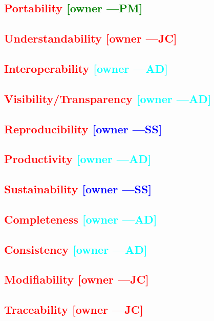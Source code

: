 \documentclass[letterpaper,cleveref]{lipics-v2019}
\newcommand{\authornote}[3]{\textcolor{#1}{[#3 ---#2]}}
\newcommand{\authornote}[3]{}
\newcommand{\wss}[1]{\authornote{blue}{SS}{#1}} %
\newcommand{\jc}[1]{\authornote{red}{JC}{#1}} %
\newcommand{\pmi}[1]{\authornote{green}{PM}{#1}} %
\newcommand{\ad}[1]{\authornote{cyan}{AD}{#1}} %
\newcommand{\notdone}[1]{\textcolor{red}{#1}}
\theoremstyle{definition}
\begin{document}
\subsection{\notdone{Portability} \pmi{owner}}

\subsection{\notdone{Understandability} \jc{owner}}

\subsection{\notdone{Interoperability} \ad{owner}}

\subsection{\notdone{Visibility/Transparency} \ad{owner}}

\subsection{\notdone{Reproducibility} \wss{owner}}

\subsection{\notdone{Productivity} \ad{owner}}

\subsection{\notdone{Sustainability} \wss{owner}}

\subsection{\notdone{Completeness} \ad{owner}}

\subsection{\notdone{Consistency} \ad{owner}}

\subsection{\notdone{Modifiability} \jc{owner}}

\subsection{\notdone{Traceability} \jc{owner}}
\end{document}
